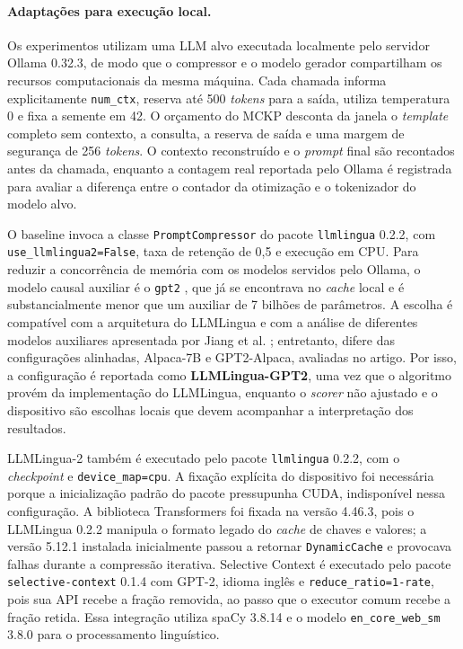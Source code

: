 \paragraph{Adaptações para execução local.}
Os experimentos utilizam uma LLM alvo executada localmente pelo servidor Ollama 0.32.3, de modo que o compressor e o modelo gerador compartilham os recursos computacionais da mesma máquina. Cada chamada informa explicitamente \texttt{num\_ctx}, reserva até 500 \textit{tokens} para a saída, utiliza temperatura 0 e fixa a semente em 42. O orçamento do MCKP desconta da janela o \textit{template} completo sem contexto, a consulta, a reserva de saída e uma margem de segurança de 256 \textit{tokens}. O contexto reconstruído e o \textit{prompt} final são recontados antes da chamada, enquanto a contagem real reportada pelo Ollama é registrada para avaliar a diferença entre o contador da otimização e o tokenizador do modelo alvo.

O baseline invoca a classe \texttt{PromptCompressor} do pacote \texttt{llmlingua} 0.2.2, com \texttt{use\_llmlingua2=False}, taxa de retenção de 0,5 e execução em CPU. Para reduzir a concorrência de memória com os modelos servidos pelo Ollama, o modelo causal auxiliar é o \texttt{gpt2} \cite{radford2019gpt2}, que já se encontrava no \textit{cache} local e é substancialmente menor que um auxiliar de 7 bilhões de parâmetros. A escolha é compatível com a arquitetura do LLMLingua e com a análise de diferentes modelos auxiliares apresentada por Jiang et al. \cite{jiang2023llmlingua}; entretanto, difere das configurações alinhadas, Alpaca-7B e GPT2-Alpaca, avaliadas no artigo. Por isso, a configuração é reportada como \textbf{LLMLingua-GPT2}, uma vez que o algoritmo provém da implementação do LLMLingua, enquanto o \textit{scorer} não ajustado e o dispositivo são escolhas locais que devem acompanhar a interpretação dos resultados.

LLMLingua-2 também é executado pelo pacote \texttt{llmlingua} 0.2.2, com o \textit{checkpoint}  e \texttt{device\_map=cpu}. A fixação explícita do dispositivo foi necessária porque a inicialização padrão do pacote pressupunha CUDA, indisponível nessa configuração. A biblioteca Transformers foi fixada na versão 4.46.3, pois o LLMLingua 0.2.2 manipula o formato legado do \textit{cache} de chaves e valores; a versão 5.12.1 instalada inicialmente passou a retornar \texttt{DynamicCache} e provocava falhas durante a compressão iterativa. Selective Context é executado pelo pacote \texttt{selective-context} 0.1.4 com GPT-2, idioma inglês e \texttt{reduce\_ratio=1-rate}, pois sua API recebe a fração removida, ao passo que o executor comum recebe a fração retida. Essa integração utiliza spaCy 3.8.14 e o modelo \texttt{en\_core\_web\_sm} 3.8.0 para o processamento linguístico.

